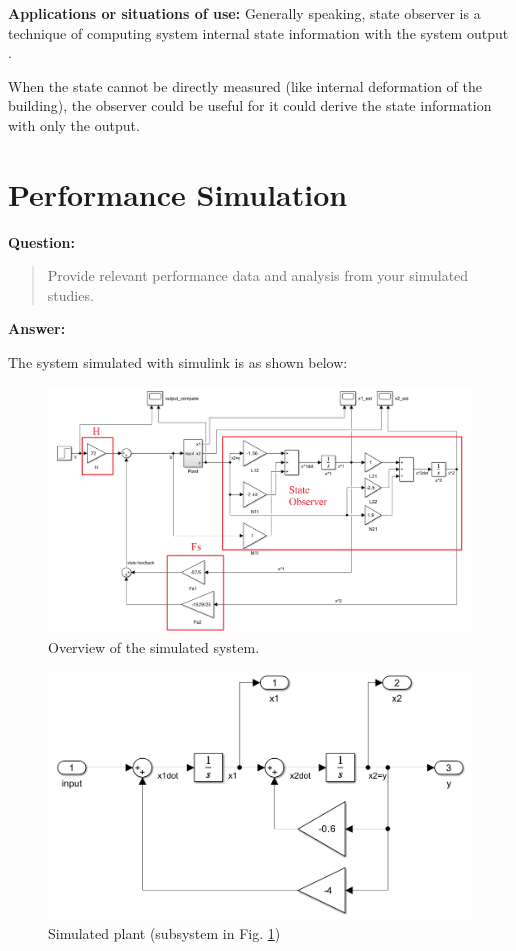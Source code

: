 \documentclass[12pt, oneside]{article}
\begin{document}
\textbf{Applications or situations of use:}
Generally speaking, state observer is a technique of computing system internal state information with the system output \cite{Observer}.

When the state cannot be directly measured (like internal deformation of the building), the observer could be useful for it could derive the state information with only the output. 

\section{Performance Simulation}
\label{Performance Simulation}
\textbf{Question:}
\begin{quote}
    Provide relevant performance data and analysis from your simulated studies.
\end{quote}
\textbf{Answer:}

The system simulated with simulink is as shown below:
\begin{figure}[htbp]
    \centering
    \includegraphics[width = \linewidth]{Report/pics/WholeSystem.png}
    \caption{Overview of the simulated system.}
    \label{fig:WholeSystem}
\end{figure}

\begin{figure}[htbp]
    \centering
    \includegraphics[width=0.75\linewidth]{Report/pics/Plant.png}
    \caption{Simulated plant (subsystem in Fig. \ref{fig:WholeSystem})}
    \label{fig:Plant}
\end{figure}
\end{document}

